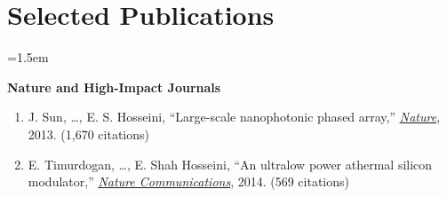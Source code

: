 \section{Selected Publications}
\vspace{0.2cm}
\begingroup
{}
\emergencystretch=1.5em

\noindent\textbf{Nature and High-Impact Journals}
\begin{enumerate}
    \item J. Sun, \ldots, E. S. Hosseini, ``Large-scale nanophotonic phased array,'' \href{https://doi.org/10.1038/nature12107}{\underline{\textit{Nature}}}, 2013. (1,670 citations)
    \item E. Timurdogan, \ldots, E. Shah Hosseini, ``An ultralow power athermal silicon modulator,'' \href{https://doi.org/10.1038/ncomms5107}{\underline{\textit{Nature Communications}}}, 2014. (569 citations)
\end{enumerate}


